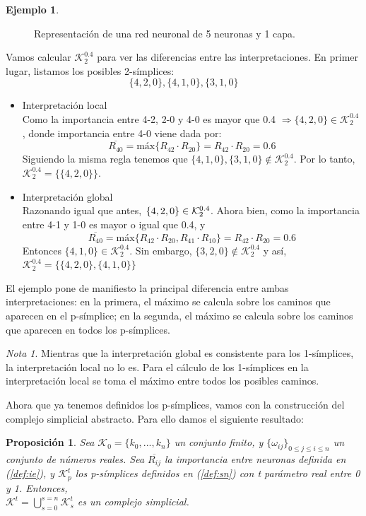 \documentclass[12pt]{article}
\numberwithin{equation}{section}
\theoremstyle{definition}
\newtheorem{ejem}{Ejemplo}
\theoremstyle{remark}
\newtheorem*{remark}{Nota}
\theoremstyle{plain}
\newtheorem{prop}{Proposición}
\begin{document}
\begin{ejem}
\begin{figure}[H]
				\caption{Representación de una red neuronal de 5 neuronas y 1 capa.}
			\end{figure}
			Vamos calcular $\mathcal{K}^{0.4}_{2}$ para ver las diferencias entre las interpretaciones. En primer lugar, 
			listamos los posibles 2-símplices: 
			$$
			\{4,2,0\},\{4,1,0\},\{3,1,0\}
			$$
			\begin{itemize}
				\item{Interpretación local}\\
					Como la importancia entre 4-2, 2-0 y 4-0 es mayor que 0.4 $\Rightarrow\{4,2,0\} \in \mathcal{K}^{0.4}_{2}$,
					donde importancia entre 4-0 viene dada por:
					$$\overline{R_{40}}=\text{máx}\{R_{42} \cdot R_{20}\}=R_{42} \cdot R_{20}=0.6$$
					Siguiendo la misma regla tenemos que $\{4,1,0\},\{3,1,0\} \notin \mathcal{K}^{0.4}_{2}$. Por lo tanto,
					$\mathcal{K}^{0.4}_{2}=\{\{4,2,0\}\}$.
				\item{Interpretación global}\\
					Razonando igual que antes,$\hspace{0.15cm}\{4,2,0\} \in \mathcal{K}^{0.4}_{2}$. Ahora bien, como la importancia
					entre 4-1 y 1-0 es mayor o igual que 0.4, y 
					$$\overline{R_{40}}=\text{máx}\{R_{42} \cdot R_{20},R_{41} \cdot R_{10}\}=R_{42} \cdot R_{20}=0.6$$ 
					Entonces $\{4,1,0\} \in \mathcal{K}^{0.4}_{2}$. Sin embargo, $\{3,2,0\} \notin \mathcal{K}^{0.4}_{2}$ y así,\\ 
					$\mathcal{K}^{0.4}_{2}=\{\{4,2,0\},\{4,1,0\}\}$
			\end{itemize}
			El ejemplo pone de manifiesto la principal diferencia entre ambas interpretaciones: en la primera, el máximo se calcula sobre los caminos
			que aparecen en el p-símplice; en la segunda, el máximo se calcula sobre los caminos que aparecen en todos los p-símplices.
			\begin{remark}
				Mientras que la interpretación global es consistente para los 1-símplices, la interpretación local no lo es. Para el cálculo
				de los 1-símplices en la interpretación local se toma el máximo entre todos los posibles caminos. 
			\end{remark}
		\end{ejem}
		
		Ahora que ya tenemos definidos los p-símplices, vamos con la construcción del complejo simplicial abstracto. Para ello 
		damos el siguiente resultado:
		\begin{prop}
			Sea $\mathcal{K}_{0}=\{k_{0},...,k_{n}\}$ un conjunto finito, y $\{\omega_{ij}\}_{0\leq j \leq i \leq n}$ un 
			conjunto de números reales. Sea $\overline{R_{ij}}$ la importancia entre neuronas 
			definida en (\ref{def:ie}), y $\mathcal{K}_{p}^{t}$ los p-símplices definidos en (\ref{def:sn}) con t
			parámetro real entre 0 y 1. Entonces, \\ 
			$\mathcal{K}^{t}=\bigcup_{s=0}^{s=n}\mathcal{K}_{s}^{t}$ es un complejo simplicial. 
			\label{prop:cs}
		\end{prop}
\end{document}
